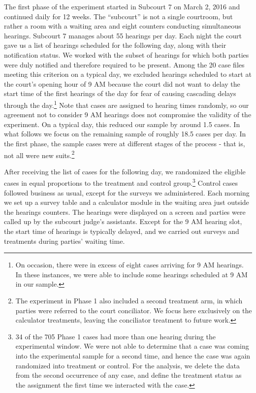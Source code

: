 \documentclass[11pt, a4paper]{article}
\begin{document}
The first phase of the experiment started in Subcourt 7 on March 2, 2016 and continued daily for 12 weeks. The ``subcourt'' is not a single courtroom, but rather a room with a waiting area and eight counters conducting simultaneous hearings. Subcourt 7 manages about 55 hearings per day. Each night the court gave us a list of hearings scheduled for the following day, along with their notification status. We worked with the subset of hearings for which both parties were duly notified and therefore required to be present. Among the 20 case files meeting this criterion on a typical day, we excluded hearings scheduled to start at the court's opening hour of 9 AM because the court did not want to delay the start time of the first hearings of the day for fear of causing cascading delays through the day.\footnote{On occasion, there were in excess of eight cases arriving for 9 AM hearings. In these instances, we were able to include some hearings scheduled at 9 AM in our sample.} Note that cases are assigned to hearing times randomly, so our agreement not to consider 9 AM hearings does not compromise the validity of the experiment. On a typical day, this reduced our sample by around 1.5 cases. In what follows we focus on the remaining sample of roughly 18.5 cases per day. In the first phase, the sample cases were at different stages of the process - that is, not all were new suits.\footnote{The experiment in Phase 1 also included a second treatment arm, in which parties were referred to the court conciliator. We focus here exclusively on the calculator treatments, leaving the conciliator treatment to future work.}
     
After receiving the list of cases for the following day, we randomized the eligible cases in equal proportions to the treatment and control group.\footnote{34 of the 705 Phase 1 cases had more than one hearing during the experimental window. We were not able to determine that a case was coming into the experimental sample for a second time, and hence the case was again randomized into treatment or control. For the analysis, we delete the data from the second occurrence of any case, and define the treatment status as the assignment the first time we interacted with the case.} Control cases followed business as usual, except for the surveys we administered. Each morning we set up a survey table and a calculator module in the waiting area just outside the hearings counters. The hearings were displayed on a screen and parties were called up by the subcourt judge's assistants. Except for the 9 AM hearing slot, the start time of hearings is typically delayed, and we carried out surveys and treatments during parties' waiting time. 
     
\end{document}
